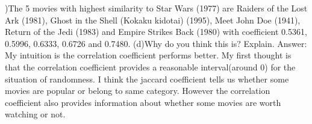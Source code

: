 \documentclass[paper=a4, fontsize=11pt]{scrartcl} %
\numberwithin{equation}{section} %
\numberwithin{figure}{section} %
\numberwithin{table}{section} %
\begin{document}
)The 5 movies with highest similarity to Star Wars (1977) are Raiders of the Lost Ark (1981), Ghost in the Shell (Kokaku kidotai) (1995), Meet John Doe (1941), Return of the Jedi (1983) and Empire Strikes Back (1980) with coefficient 0.5361, 0.5996, 0.6333, 0.6726 and 0.7480.
\newline
\newline
(d)Why do you think this is? Explain.
\newline
\newline
Answer:
\newline
My intuition is the correlation coefficient performs better. My first thought is that the correlation coefficient provides a reasonable interval(around 0) for the situation of randomness. I think the jaccard coefficient tells us whether some movies are popular or belong to same category. However the correlation coefficient also provides information about whether some movies are worth watching or not.
\end{document}
